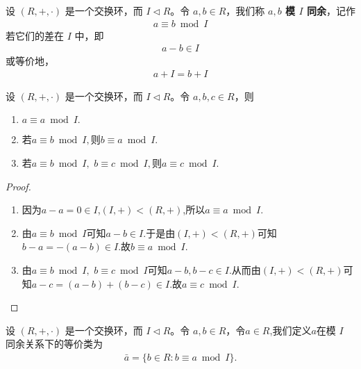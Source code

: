 \documentclass[../../main.tex]{subfiles}
\begin{document}
\begin{definition}[模理想同余]
设 $(R, +, \cdot)$ 是一个交换环，而 $I \lhd R$。令 $a, b \in R$，我们称 \textbf{$a, b$ 模 $I$ 同余}，记作
\begin{align*}
a \equiv b \bmod I
\end{align*}
若它们的差在 $I$ 中，即
\begin{align*}
a - b \in I
\end{align*}
或等价地，
\begin{align*}
a + I = b + I
\end{align*}
\end{definition}

\begin{proposition}[模理想同余是一个等价关系]\label{proposition:模理想同余是一个等价关系}
设 $(R, +, \cdot)$ 是一个交换环，而 $I \lhd R$。令 $a, b ,c\in R$，则
\begin{enumerate}[(1)]
\item $a\equiv a \bmod I.$

\item 若$a\equiv b \bmod I,$则$b\equiv a \bmod I.$

\item 若$a\equiv b \bmod I,$ $b\equiv c \bmod I,$则$a\equiv c \bmod I.$
\end{enumerate}
\end{proposition}
\begin{proof}
\begin{enumerate}[(1)]
\item 因为$a-a=0\in I$,$(I,+)<(R,+)$,所以$a\equiv a \bmod I.$

\item 由$a\equiv b \bmod I$可知$a-b\in I.$于是由$(I,+)<(R,+)$可知$b-a=-(a-b)\in I$.故$b\equiv a \bmod I.$

\item 由$a\equiv b \bmod I,$ $b\equiv c \bmod I$可知$a-b,b-c\in I$.从而由$(I,+)<(R,+)$可知$a-c=(a-b)+(b-c)\in I.$故$a\equiv c \bmod I.$
\end{enumerate}
\end{proof}

\begin{definition}\label{definition:模理想同余等价类}
设 $(R, +, \cdot)$ 是一个交换环，而 $I \lhd R$。令 $a, b \in R$，令$a\in R$,我们定义$a$在模 $I$ 同余关系下的等价类为
\begin{align*}
\bar{a}=\{b\in R:b\equiv a \bmod I\}.
\end{align*}
\end{definition}
\end{document}
